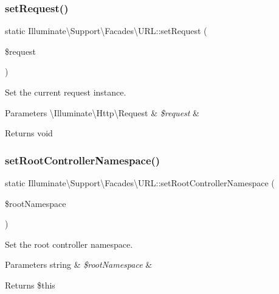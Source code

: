 \subsubsection{\texorpdfstring{set\+Request()}{setRequest()}}
{\footnotesize\ttfamily static Illuminate\textbackslash{}\+Support\textbackslash{}\+Facades\textbackslash{}\+U\+R\+L\+::set\+Request (\begin{DoxyParamCaption}\item[{}]{\$request }\end{DoxyParamCaption})\hspace{0.3cm}{\ttfamily [static]}}

Set the current request instance.


\begin{DoxyParams}[1]{Parameters}
\textbackslash{}\+Illuminate\textbackslash{}\+Http\textbackslash{}\+Request & {\em \$request} & \\
\hline
\end{DoxyParams}
\begin{DoxyReturn}{Returns}
void 
\end{DoxyReturn}
\mbox{\label{class_illuminate_1_1_support_1_1_facades_1_1_u_r_l_a7e797a6b02f0f32f0aec3d7bda773f21}} 
\subsubsection{\texorpdfstring{set\+Root\+Controller\+Namespace()}{setRootControllerNamespace()}}
{\footnotesize\ttfamily static Illuminate\textbackslash{}\+Support\textbackslash{}\+Facades\textbackslash{}\+U\+R\+L\+::set\+Root\+Controller\+Namespace (\begin{DoxyParamCaption}\item[{}]{\$root\+Namespace }\end{DoxyParamCaption})\hspace{0.3cm}{\ttfamily [static]}}

Set the root controller namespace.


\begin{DoxyParams}[1]{Parameters}
string & {\em \$root\+Namespace} & \\
\hline
\end{DoxyParams}
\begin{DoxyReturn}{Returns}
\$this 
\end{DoxyReturn}
\mbox{\label{class_illuminate_1_1_support_1_1_facades_1_1_u_r_l_a6f7d9edb24f65c7a7b3d67c14b7b023b}} 
